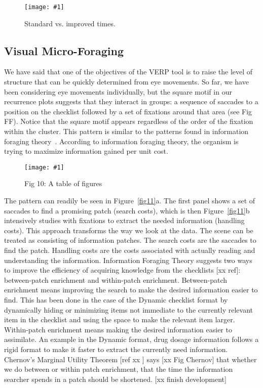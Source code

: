 \documentclass{sigchi}
\newcommand{\insertpicture}[2]{\begin{center}\texttt{[image: \#1]}\end{center}}
\begin{document}
\begin{figure}
	\insertpicture{figures/time.pdf}{0.5}
	\caption{Standard vs. improved times.\label{fig:time}}
\end{figure}

\subsection{Visual Micro-Foraging} 
We have said that one of the objectives of the VERP tool is to raise the
level of structure that can be quickly determined from eye movements. So
far, we have been considering eye movements individually, but the square
motif in our recurrence plots suggests that they interact in groups: a
sequence of saccades to a position on the checklist followed by a set of
fixations around that area (see Fig FF).  Notice that the square motif
appears regardless of the order of the fixation within the cluster. This
pattern is similar to the patterns found in information foraging
theory~\cite{Pirolli_1999}. According to information foraging theory, the
organism is trying to maximize information gained per unit cost.


\begin{figure*}

	\insertpicture{figures/dummy.eps}{0.8}
	\caption{Fig 10: A table of figures \label{fig10}}

\end{figure*}

The pattern can readily be seen in Figure~\ref{fig11}a. The first panel shows a set of
saccades to find a promising patch (search costs), which is then 
Figure~\ref{fig11}b intensively studies with fixations to extract the 
needed information (handling costs).  This approach transforms the way we look at the data.
The scene can be treated as consisting of information patches. The search
costs are the saccades to find the patch. Handling costs are the costs
associated with actually reading and understanding the information.
Information Foraging Theory suggests two ways to improve the efficiency of
acquiring knowledge from the checklists [xx ref]: between-patch enrichment
and within-patch enrichment. Between-patch enrichment means improving the
search to make the desired information easier to find. This has been done
in the case of the Dynamic checklist format by dynamically hiding or
minimizing items not immediate to the currently relevant item in the
checklist and using the space to make the relevant item larger.
Within-patch enrichment means making the desired information easier to
assimilate. An example in the Dynamic format, drug dosage information
follows a rigid format to make it faster to extract the currently need
information. Chernov’s Marginal Utility Theorem [ref xx ] says [xx Fig Chernov]
that whether we do between or within patch enrichment, that the time the
information searcher spends in a patch should be shortened. [xx finish
development]
\end{document}
